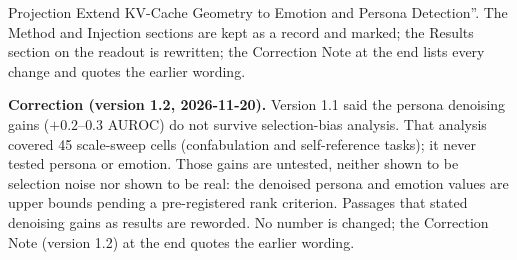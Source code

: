 \documentclass[11pt,a4paper]{article}
\begin{document}
{{Projection Extend KV-Cache Geometry to Emotion and Persona Detection''. The
Method and Injection sections are kept as a record and marked; the Results
section on the readout is rewritten; the Correction Note at the end lists
every change and quotes the earlier wording.
\par\smallskip\noindent
\textbf{Correction (version 1.2, 2026-11-20).} Version 1.1 said the
persona denoising gains ($+0.2$--$0.3$ AUROC) do not survive selection-bias
analysis. That analysis covered 45 scale-sweep cells (confabulation and
self-reference tasks); it never tested persona or emotion. Those gains are
untested, neither shown to be selection noise nor shown to be real: the
denoised persona and emotion values are upper bounds pending a
pre-registered rank criterion. Passages that stated denoising gains as
results are reworded. No number is changed; the Correction Note
(version 1.2) at the end quotes the earlier wording.}}

\bigskip
\end{document}
